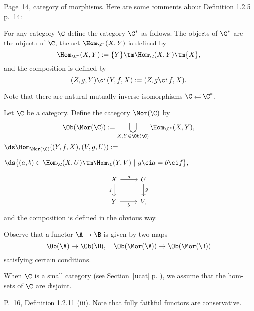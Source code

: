 \documentclass[12pt]{article}
\theoremstyle{remark}
\theoremstyle{definition}
\begin{document}


\begin{s}
Page~14, category of morphisms. Here are some comments about Definition 1.2.5 p.~14:

\begin{nota}
For any category $\C$ define the category $\C^*$\index{$\C^*$} as follows. The objects of $\C^*$ are the objects of $\C$, the set $\Hom_{\C^*}(X,Y)$ is defined by 
$$
\Hom_{\C^*}(X,Y):=\{Y\}\tm\Hom_{\C}(X,Y)\tm\{X\},
$$
and the composition is defined by 
$$
(Z,g,Y)\ci(Y,f,X):=(Z,g\ci f,X).
$$ 
\end{nota}

Note that there are natural mutually inverse isomorphisms $\C\rightleftarrows\C^*$. 

\begin{nota}
Let $\C$ be a category. Define the category $\Mor(\C)$ \index{$\Mor$} by 
$$
\Ob(\Mor(\C)):=\bigcup_{X,Y\in\Ob(\C)}\Hom_{\C^*}(X,Y),
$$
$\ds\Hom_{\Mor(\C)}((Y,f,X),(V,g,U)):=$\bigskip 

$\hfill\ds\{(a,b)\in\Hom_\C(X,U)\tm\Hom_\C(Y,V)\ | \ g\ci a=b\ci f\},$\bigskip

$$
\begin{tikzcd}
X\ar{d}[swap]{f}\ar{r}{a}&U\ar{d}{g}\\ 
Y\ar{r}[swap]{b}&V,
\end{tikzcd}
$$ 
and the composition is defined in the obvious way.
\end{nota}

Observe that a functor $\A\to\B$ is given by two maps 
$$
\Ob(\A)\to\Ob(\B),\quad\Ob(\Mor(\A))\to\Ob(\Mor(\B))
$$ 
satisfying certain conditions.

When $\C$ is a small category (see Section~\ref{ucat} p. ), we assume that the hom-sets of $\C$ are disjoint.
\end{s}

%

\begin{s}
P.~16, Definition 1.2.11 (iii). Note that fully faithful functors are conservative. 
\end{s}

%

\begin{comment}
\begin{s}
P.~16. Here is a question. 

Let $\U$ be a universe, let $\C$ be a category such that $\Hom_\C(X,Y)\in\U$ for all objects $X,Y$ of $\C$, and let $\Set$ be the category of $\U$-sets, let $F:\C^{\op}\to\Set$ be a \emph{representable} functor. 

Is the set of subfunctors of $F$ equipotent to some $\U$-set? 

Same question for the set of quotients of $F$. 
\end{s}
\end{comment}
\end{document}
